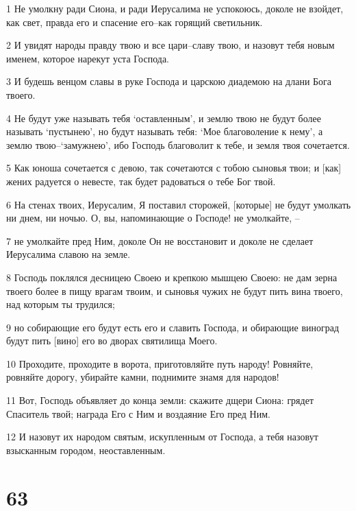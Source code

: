 \par 1 Не умолкну ради Сиона, и ради Иерусалима не успокоюсь, доколе не взойдет, как свет, правда его и спасение его--как горящий светильник.
\par 2 И увидят народы правду твою и все цари--славу твою, и назовут тебя новым именем, которое нарекут уста Господа.
\par 3 И будешь венцом славы в руке Господа и царскою диадемою на длани Бога твоего.
\par 4 Не будут уже называть тебя `оставленным', и землю твою не будут более называть `пустынею', но будут называть тебя: `Мое благоволение к нему', а землю твою--`замужнею', ибо Господь благоволит к тебе, и земля твоя сочетается.
\par 5 Как юноша сочетается с девою, так сочетаются с тобою сыновья твои; и [как] жених радуется о невесте, так будет радоваться о тебе Бог твой.
\par 6 На стенах твоих, Иерусалим, Я поставил сторожей, [которые] не будут умолкать ни днем, ни ночью. О, вы, напоминающие о Господе! не умолкайте, --
\par 7 не умолкайте пред Ним, доколе Он не восстановит и доколе не сделает Иерусалима славою на земле.
\par 8 Господь поклялся десницею Своею и крепкою мышцею Своею: не дам зерна твоего более в пищу врагам твоим, и сыновья чужих не будут пить вина твоего, над которым ты трудился;
\par 9 но собирающие его будут есть его и славить Господа, и обирающие виноград будут пить [вино] его во дворах святилища Моего.
\par 10 Проходите, проходите в ворота, приготовляйте путь народу! Ровняйте, ровняйте дорогу, убирайте камни, поднимите знамя для народов!
\par 11 Вот, Господь объявляет до конца земли: скажите дщери Сиона: грядет Спаситель твой; награда Его с Ним и воздаяние Его пред Ним.
\par 12 И назовут их народом святым, искупленным от Господа, а тебя назовут взысканным городом, неоставленным.

\chapter{63}


